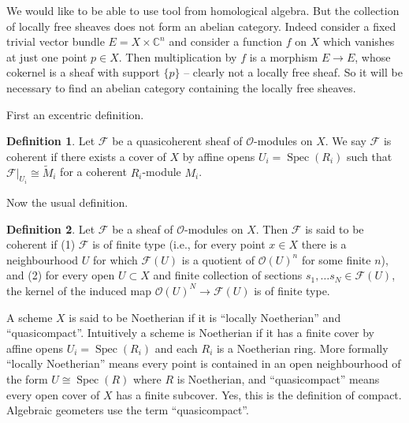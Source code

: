 \documentclass[12pt]{article}
\theoremstyle{plain}
\theoremstyle{definition}
\newtheorem{defn}{Definition}[section]
\numberwithin{equation}{section}
\DeclareMathOperator{\coker}{coker}
\DeclareMathOperator{\spec}{Spec}
\newcommand{\wtil}[1]{\widetilde{#1}}
\newcommand{\al}{\alpha}
\newcommand{\C}{\mathbb{C}}
\newcommand{\CF}{\mathcal{F}}
\newcommand{\OO}{\mathcal{O}}
\begin{document}
We would like to be able to use tool from homological algebra. But the collection of locally free sheaves does not form an abelian category. Indeed consider a fixed trivial vector bundle $E = X \times \C^n$ and consider a function $f$ on $X$ which vanishes at just one point $p \in X$. Then multiplication by $f$ is a morphism $E \rightarrow E$, whose cokernel is a sheaf with support $\{p\}$ -- clearly not a locally free sheaf. So it will be necessary to find an abelian category containing the locally free sheaves.





First an excentric definition.
\begin{defn}
Let $\CF$ be a quasicoherent sheaf of $\OO$-modules on $X$. We say $\CF$ is coherent if there exists a cover of $X$ by affine opens $U_i = \spec(R_i)$ such that $\CF|_{U_i} \cong \wtil M_i$ for a coherent $R_i$-module $M_i$.
\end{defn}
Now the usual definition.
\begin{defn}
Let $\CF$ be a sheaf of $\OO$-modules on $X$. Then $\CF$ is said to be coherent if (1) $\CF$ is of finite type (i.e., for every point $x \in X$ there is a neighbourhood $U$ for which $\CF(U)$ is a quotient of $\OO(U)^{n}$ for some finite $n$), and (2) for every open $U \subset X$ and finite collection of sections $s_1, \ldots s_N \in \CF(U)$, the kernel of the induced map $\OO(U)^{N} \rightarrow \CF(U)$ is of finite type.
\end{defn}

A scheme $X$ is said to be Noetherian if it is ``locally Noetherian'' and ``quasicompact''. Intuitively a scheme is Noetherian if it has a finite cover by affine opens $U_i = \spec(R_i)$ and each $R_i$ is a Noetherian ring. More formally ``locally Noetherian'' means every point is contained in an open neighbourhood of the form $U \cong \spec(R)$ where $R$ is Noetherian, and ``quasicompact'' means every open cover of $X$ has a finite subcover. Yes, this is the definition of compact. Algebraic geometers use the term ``quasicompact''.
\end{document}
